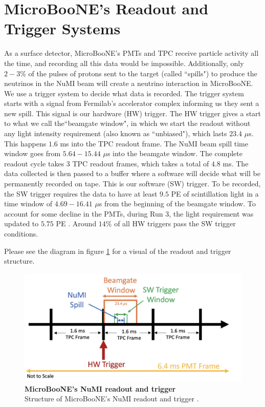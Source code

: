 \section{MicroBooNE's Readout and Trigger Systems}
  
As a surface detector, MicroBooNE's PMTs and TPC receive particle activity all the time, and recording all this data would be impossible. Additionally, only $2-3\%$ of the pulses of protons sent to the target (called ``spills") to produce the neutrinos in the NuMI beam will create a neutrino interaction in MicroBooNE. We use a trigger system to decide what data is recorded.
The trigger system starts with a signal from Fermilab's accelerator complex informing us they sent a new spill. This signal is our hardware (HW) trigger. The HW trigger gives a start to what we call the``beamgate window", in which we start the readout without any light intensity requirement (also known as ``unbiased"), which lasts $23.4$ $\mu $s. This happens $1.6$ ms into the TPC readout frame. The NuMI beam spill time window goes from $5.64- 15.44$ $\mu$s into the beamgate window. The complete readout cycle takes 3 TPC readout frames, which takes a total of $4.8$ ms.
The data collected is then passed to a buffer where a software will decide what will be permanently recorded on tape. This is our software (SW) trigger. To be recorded, the SW trigger requires the data to have at least $9.5$ PE of scintillation light in a time window of $4.69- 16.41$ $\mu$s from the beginning of the beamgate window. To account for some decline in the PMTs, during Run 3, the light requirement was updated to $5.75$ PE \cite{numi_redmine}. 
Around $14\%$ of all HW triggers pass the SW trigger conditions. 

Please see the diagram in figure \ref{trig} for a visual of the readout and trigger structure.

\begin{figure}[h!]
    \centering
    \includegraphics[width=150mm]{Figures/numi_trigger.jpg}
    \caption[MicroBooNE's NuMI readout and trigger]{\textbf{MicroBooNE's NuMI readout and trigger}\\Structure of MicroBooNE's NuMI readout and trigger \cite{krish_phd}.}
    \label{trig}
\end{figure}

